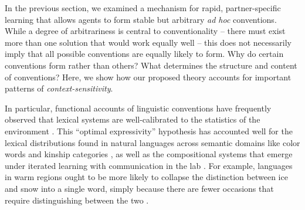 
In the previous section, we examined a mechanism for rapid, partner-specific learning that allows agents to form stable but arbitrary \emph{ad hoc} conventions. 
While a degree of arbitrariness is central to conventionality -- there must exist more than one solution that would work equally well -- this does not necessarily imply that all possible conventions are equally likely to form.
Why do certain conventions form rather than others?
What determines the structure and content of conventions? 
Here, we show how our proposed theory accounts for important patterns of \emph{context-sensitivity}.

In particular, functional accounts of linguistic conventions have frequently observed that lexical systems are well-calibrated to the statistics of the environment \cite{gibson2019efficiency}.
This ``optimal expressivity'' hypothesis has accounted well for the lexical distributions found in natural languages across semantic domains like color words and kinship categories \cite{KempRegier12_KinshipCategories,regier201511,gibson2017color,kemp2018semantic}, as well as the compositional systems that emerge under iterated learning with communication in the lab \cite{WintersKirbySmith14_LanguagesAdapt, KirbyTamarizCornishSmith15_CompressionCommunication}. 
For example, languages in warm regions ought to be more likely to collapse the distinction between ice and snow into a single word, simply because there are fewer occasions that require distinguishing between the two \cite{regier2016languages}. 

